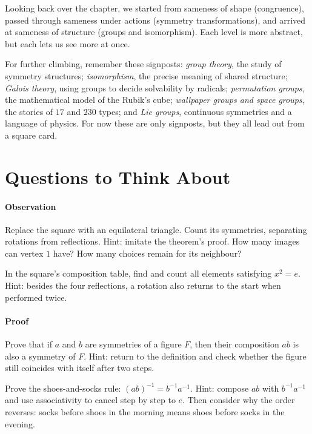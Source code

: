 Looking back over the chapter, we started from sameness of shape (congruence), passed through sameness under actions (symmetry transformations), and arrived at sameness of structure (groups and isomorphism). Each level is more abstract, but each lets us see more at once.

\begin{pandeng}
For further climbing, remember these signposts: \emph{group theory}, the study of symmetry structures; \emph{isomorphism}, the precise meaning of shared structure; \emph{Galois theory}, using groups to decide solvability by radicals; \emph{permutation groups}, the mathematical model of the Rubik's cube; \emph{wallpaper groups and space groups}, the stories of $17$ and $230$ types; and \emph{Lie groups}, continuous symmetries and a language of physics. For now these are only signposts, but they all lead out from a square card.
\end{pandeng}

\section*{Questions to Think About}

\paragraph{Observation}
\begin{sikao}
  \item Replace the square with an equilateral triangle. Count its symmetries, separating rotations from reflections. Hint: imitate the theorem's proof. How many images can vertex $1$ have? How many choices remain for its neighbour?
  \item In the square's composition table, find and count all elements satisfying $x^2=e$. Hint: besides the four reflections, a rotation also returns to the start when performed twice.
\end{sikao}

\paragraph{Proof}
\begin{sikao}
  \item Prove that if $a$ and $b$ are symmetries of a figure $F$, then their composition $ab$ is also a symmetry of $F$. Hint: return to the definition and check whether the figure still coincides with itself after two steps.
  \item Prove the shoes-and-socks rule: $(ab)^{-1}=b^{-1}a^{-1}$. Hint: compose $ab$ with $b^{-1}a^{-1}$ and use associativity to cancel step by step to $e$. Then consider why the order reverses: socks before shoes in the morning means shoes before socks in the evening.
\end{sikao}


